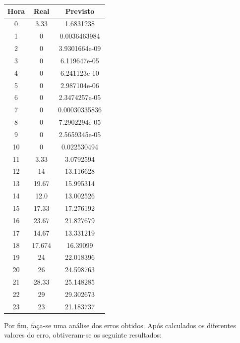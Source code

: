 \documentclass[a4paper, 12pt]{article}
\begin{document}
\begin{table}[H]
	\centering
	\begin{tabular}{||c||c|c||}
		\hline\hline
		Hora & Real&Previsto\\
		\hline\hline
		0 & 
3.33
 & 1.6831238\\
		\hline
		1  &
0 &0.0036463984 \\
		\hline
		2 & 0 & 	3.9301664e-09\\
		\hline
		3  & 0

 &  6.119647e-05\\
		\hline
		4 & 0
 &6.241123e-10 \\
		\hline
		5  &0 
 &2.987104e-06 \\
		\hline
		6 & 0

 & 

2.3474257e-05 \\
		\hline
		7 & 0

 & 0.00030335836\\
		\hline
		8  &0
 & 7.2902294e-05\\
		\hline
		9 & 0 &  2.5659345e-05	\\
		\hline
		10 & 
0
 & 0.022530494 \\
		\hline
		11  &
3.33 &3.0792594 \\
		\hline
		12 & 14 & 13.116628	\\
		\hline
		13  & 
19.67 
 &  15.995314\\
		\hline
		14 & 
 12.0 &  13.002526\\
		\hline
		15  & 17.33
 & 17.276192\\
		\hline
		16 & 
23.67
 & 21.827679

 \\
		\hline
		17 & 
14.67
 &13.331219 \\
		\hline
		18  &
 17.674& 16.39099\\
		\hline
		19 & 24 & 	22.018396\\
		\hline
		20 & 
26
 & 24.598763 \\
		\hline
		21  &
 28.33& 25.148285\\
		\hline
		22 & 29 & 29.302673	\\
		\hline
		23  & 
23
 & 21.183737\\
		\hline\hline
	\end{tabular}
\end{table}

Por fim, faça-se uma análise dos erros obtidos. Após calculados os diferentes valores do erro, obtiveram-se os seguinte resultados:
\end{document}
